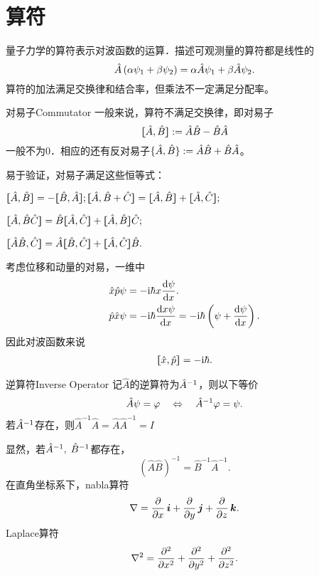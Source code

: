 \section{算符}
量子力学的算符表示对波函数的运算．描述可观测量的算符都是线性的
\[
	\hat A\kh{\alpha\psi_1+\beta\psi_2}=\alpha\hat A\psi_1+\beta\hat A\psi_2.
\]
算符的加法满足交换律和结合率，但乘法不一定满足分配率。
\begin{definition}{对易子}{Commutator}
	一般来说，算符不满足交换律，即对易子
	\[
		\cmm AB:=\hat A\hat B-\hat B\hat A
	\]
	一般不为0．相应的还有反对易子$\acmm AB:=\hat A\hat B+\hat B\hat A$。
\end{definition}
易于验证，对易子满足这些恒等式：
\begin{compactenum}
	\item $\cmm AB=-\cmm BA;$\qquad$\zkh{\hat A,\hat B+\hat C}=\cmm AB+\cmm AC;$
	\item $\zkh{\hat A,\hat B\hat C}=\hat B\cmm AC+\cmm AB\hat C;$
	\item $\zkh{\hat A\hat B,\hat C}=\hat A\cmm BC+\cmm AC\hat B.$
\end{compactenum}

考虑位移和动量的对易，一维中
\begin{align*}
	\hat x\hat p\psi & =-\i\hbar x\dv\psi{x}.                             \\
	\hat p\hat x\psi & =-\i\hbar\dv{x\psi}x=-\i\hbar\kh{\psi+\dv\psi{x}}.
\end{align*}
因此对波函数来说
\begin{align}
	\cmm xp=-\i\hbar.
\end{align}
\begin{definition}{逆算符}{Inverse Operator}
	记$\hat A$的逆算符为$\hat A\iv$，则以下等价
	\[
		\hat A\psi=\vf\ifnf\hat A^{-1}\vf=\psi.
	\]
	若$\hat A\iv$存在，则$\hat A^{-1}\hat A=\hat A\hat A^{-1}=I$
\end{definition}
显然，若$\hat A\iv,\;\hat B\iv$都存在，
\[
	(\hat A\hat B)^{-1}=\hat B^{-1}\hat A^{-1}.
\]
\iffalse
	在直角坐标系下，nabla算符
	\[
		\nabla=\pp x\ibm i+\pp y\ibm j+\pp z\ibm k.
	\]
	Laplace算符
	\[
		\nabla^2=\pp[2]x+\pp[2]y+\pp[2]z.
	\]

